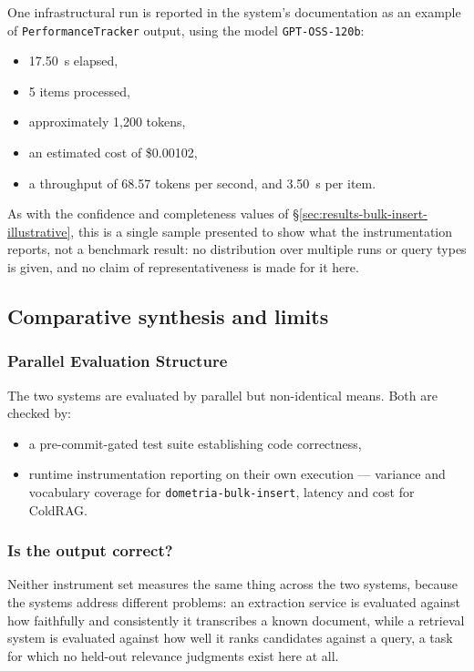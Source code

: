 One infrastructural run is reported in the system's documentation as an example of \texttt{PerformanceTracker} output, using the model \texttt{GPT-OSS-120b}: 
\begin{itemize}
\item 17.50~s elapsed, 
\item 5 items processed, 
\item approximately 1{,}200 tokens, 
\item an estimated cost of \$0.00102, 
\item a throughput of 68.57 tokens per second, and 3.50~s per item. 
\end{itemize}

As with the confidence and completeness values of \S\ref{sec:results-bulk-insert-illustrative}, this is a single sample presented to show what the instrumentation reports, not a benchmark result: no distribution over multiple runs or query types is given, and no claim of representativeness is made for it here.

\subsection{Comparative synthesis and limits}
\label{sec:results-synthesis}

\subsubsection{Parallel Evaluation Structure}
The two systems are evaluated by parallel but non-identical means. Both are checked by:

\begin{itemize}
\item a pre-commit-gated test suite establishing code correctness, 
\item runtime instrumentation reporting on their own execution — variance and vocabulary coverage for \texttt{dometria-bulk-insert}, latency and cost for ColdRAG. 
\end{itemize}

\subsubsection{Is the output correct?}
Neither instrument set measures the same thing across the two systems, because the systems address different problems: an extraction service is evaluated against how faithfully and consistently it transcribes a known document, while a retrieval system is evaluated against how well it ranks candidates against a query, a task for which no held-out relevance judgments exist here at all.

